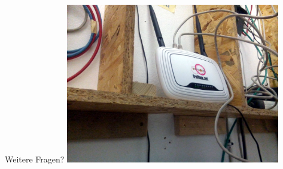\documentclass{beamer}
\begin{document}
\begin{frame}{Weitere Fragen?}
\vfill
\centering
\includegraphics[width=0.7\textwidth]{images/irl_router}
\vfill
\end{frame}
\end{document}
